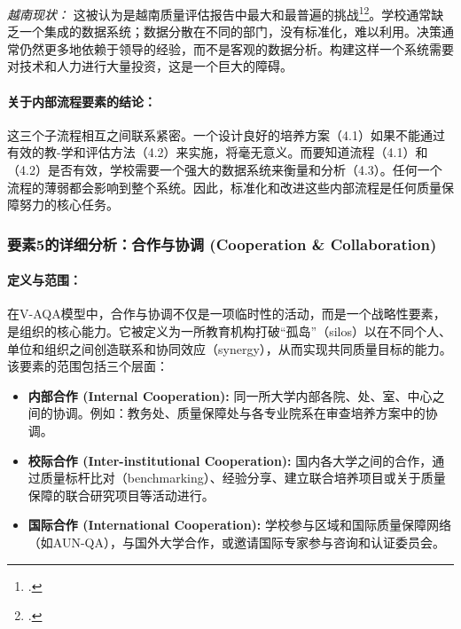 \textit{越南现状：} 这被认为是越南质量评估报告中最大和最普遍的挑战\footcite{CommonFailureCriteria}\footcite{AUN-QA_Challenges_VN}。学校通常缺乏一个集成的数据系统；数据分散在不同的部门，没有标准化，难以利用。决策通常仍然更多地依赖于领导的经验，而不是客观的数据分析。构建这样一个系统需要对技术和人力进行大量投资，这是一个巨大的障碍。

\paragraph{关于内部流程要素的结论：}
这三个子流程相互之间联系紧密。一个设计良好的培养方案（4.1）如果不能通过有效的教-学和评估方法（4.2）来实施，将毫无意义。而要知道流程（4.1）和（4.2）是否有效，学校需要一个强大的数据系统来衡量和分析（4.3）。任何一个流程的薄弱都会影响到整个系统。因此，标准化和改进这些内部流程是任何质量保障努力的核心任务。



\subsubsection{要素5的详细分析：合作与协调 (Cooperation \& Collaboration)}
\label{subsubsec:thanh_to_5}

\paragraph{定义与范围：}
在V-AQA模型中，合作与协调不仅是一项临时性的活动，而是一个战略性要素，是组织的核心能力。它被定义为一所教育机构打破“孤岛”（silos）以在不同个人、单位和组织之间创造联系和协同效应（synergy），从而实现共同质量目标的能力。该要素的范围包括三个层面：
\begin{itemize}
    \item \textbf{内部合作 (Internal Cooperation):} 同一所大学内部各院、处、室、中心之间的协调。例如：教务处、质量保障处与各专业院系在审查培养方案中的协调。
    \item \textbf{校际合作 (Inter-institutional Cooperation):} 国内各大学之间的合作，通过质量标杆比对（benchmarking）、经验分享、建立联合培养项目或关于质量保障的联合研究项目等活动进行。
    \item \textbf{国际合作 (International Cooperation):} 学校参与区域和国际质量保障网络（如AUN-QA），与国外大学合作，或邀请国际专家参与咨询和认证委员会。
\end{itemize}


